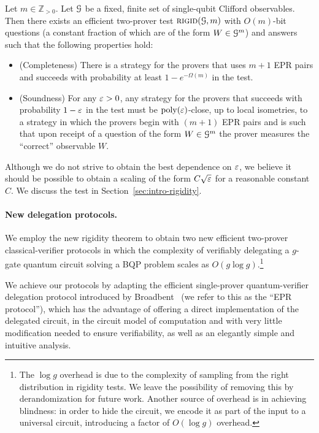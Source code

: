 \begin{theorem}[Informal]\label{thm:rigid-informal}
Let $m\in\mathbb{Z}_{>0}$. Let $\cal G$ be a fixed, finite set of single-qubit Clifford observables. Then there exists an efficient two-prover test $\textsc{rigid}({\cal G},m)$ with $O(m)$-bit questions (a constant fraction of which are of the form $W\in{\cal G}^m$) and answers such that the following properties hold:
\begin{itemize}[nolistsep]
\item (Completeness) There is a strategy for the provers that uses $m+1$ EPR pairs and succeeds with probability at least $1 - e^{-\Omega(m)}$ in the test.
\item (Soundness) For any $\varepsilon>0$, any strategy for the provers that succeeds with probability $1-\varepsilon$ in the test must be $\operatorname{poly}(\varepsilon)$-close, up to local isometries, to a strategy in which the provers begin with $(m+1)$ EPR pairs and is such that upon receipt of a question of the form $W\in {\cal G}^m$ the prover measures the ``correct'' observable $W$. 
\end{itemize}
\end{theorem}

Although we do not strive to obtain the best dependence on $\varepsilon$, we believe it
should be possible to obtain a scaling of the form $C\sqrt{\varepsilon}$ for a
reasonable constant~$C$. We discuss the test in Section~\ref{sec:intro-rigidity}. %


\paragraph{New delegation protocols.}
We employ the new rigidity theorem to obtain two new efficient
two-prover classical-verifier protocols in which the complexity of verifiably
delegating a $g$-gate quantum circuit solving a BQP problem scales as $O(g\log g)$.\footnote{The $\log
g$ overhead is due to the complexity of sampling from the right distribution in
rigidity tests. We leave the possibility of removing this by derandomization for
future work. Another source of overhead is in achieving blindness: in order to
hide the circuit, we encode it as part of the input to a universal circuit,
introducing a factor of $O(\log g)$ overhead.} 

We achieve our protocols by adapting the efficient single-prover quantum-verifier delegation
protocol introduced by Broadbent~\cite{broadbent15howtoverify} (we refer to this as the ``EPR protocol''), which has the advantage of offering a direct implementation of the delegated circuit, in the circuit model of computation and with very little modification needed to ensure verifiability, as well as an elegantly simple and intuitive analysis. 
 
